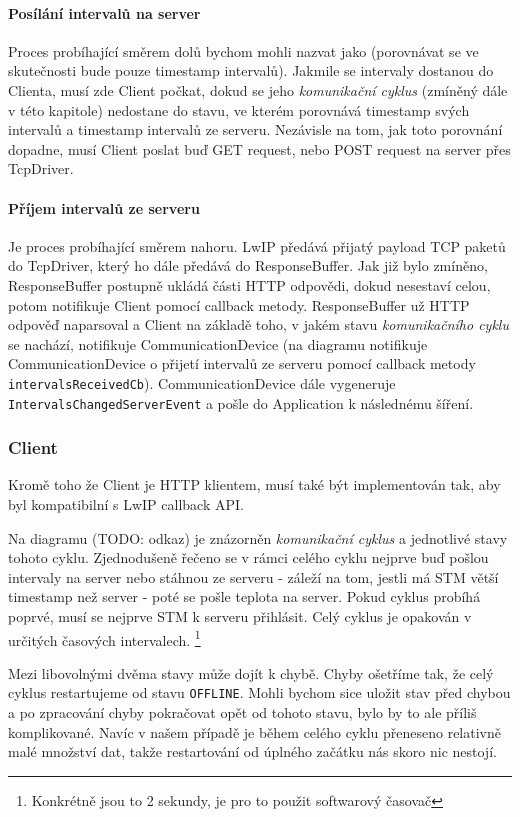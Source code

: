 \paragraph{Posílání intervalů na server}
Proces probíhající směrem dolů bychom mohli nazvat jako  (porovnávat se ve skutečnosti bude
pouze timestamp intervalů).
Jakmile se intervaly dostanou do Clienta, musí zde Client počkat, dokud se jeho \emph{komunikační cyklus}
(zmíněný dále v této kapitole) nedostane do stavu, ve kterém porovnává timestamp svých intervalů
a timestamp intervalů ze serveru.
Nezávisle na tom, jak toto porovnání dopadne, musí Client poslat buď GET request, nebo POST request
na server přes TcpDriver.

\paragraph{Příjem intervalů ze serveru}
Je proces probíhající směrem nahoru.
LwIP předává přijatý payload TCP paketů do TcpDriver, který ho dále předává do ResponseBuffer.
Jak již bylo zmíněno, ResponseBuffer postupně ukládá části HTTP odpovědi, dokud nesestaví celou,
potom notifikuje Client pomocí callback metody.
ResponseBuffer už HTTP odpověď naparsoval a Client na základě toho, v jakém stavu \emph{komunikačního cyklu}
se nachází, notifikuje CommunicationDevice (na diagramu notifikuje CommunicationDevice o přijetí
intervalů ze serveru pomocí callback metody \texttt{intervalsReceivedCb}).
CommunicationDevice dále vygeneruje \texttt{IntervalsChangedServerEvent} a pošle do Application
k následnému šíření.

\subsubsection{Client}
Kromě toho že Client je HTTP klientem, musí také být implementován tak, aby byl kompatibilní s LwIP
callback API.


Na diagramu (TODO: odkaz) je znázorněn \emph{komunikační cyklus} a jednotlivé stavy tohoto cyklu.
Zjednodušeně řečeno se v rámci celého cyklu nejprve buď pošlou intervaly na server nebo stáhnou ze
serveru - záleží na tom, jestli má STM větší timestamp než server - poté se pošle teplota na server.
Pokud cyklus probíhá poprvé, musí se nejprve STM k serveru přihlásit.
Celý cyklus je opakován v určitých časových intervalech.
\footnote{Konkrétně jsou to 2 sekundy, je pro to použit softwarový časovač}

Mezi libovolnými dvěma stavy může dojít k chybě.
Chyby ošetříme tak, že celý cyklus restartujeme od stavu \texttt{OFFLINE}.
Mohli bychom sice uložit stav před chybou a po zpracování chyby pokračovat opět od tohoto stavu,
bylo by to ale příliš komplikované.
Navíc v našem případě je během celého cyklu přeneseno relativně malé množství dat, takže restartování
od úplného začátku nás skoro nic nestojí.


